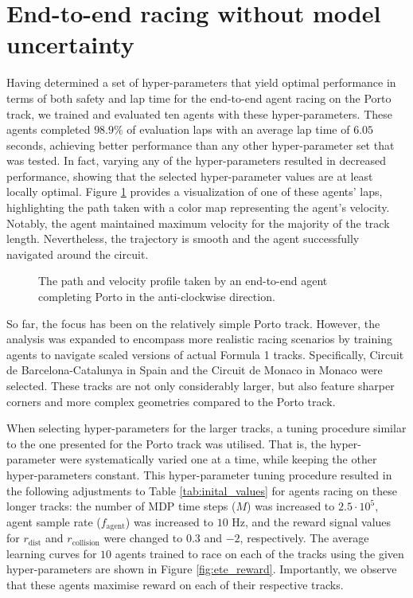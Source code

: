 
\section{End-to-end racing without model uncertainty}

Having determined a set of hyper-parameters that yield optimal performance in terms of both safety and lap time for the end-to-end agent racing on the Porto track, 
we trained and evaluated ten agents with these hyper-parameters.
These agents completed $98.9\%$ of evaluation laps with an average lap time of $6.05$ seconds, achieving better performance than any other hyper-parameter set that was tested.
In fact, varying any of the hyper-parameters resulted in decreased performance, showing that the selected hyper-parameter values are at least locally optimal.
Figure \ref{fig:ete_porto} provides a visualization of one of these agents' laps, highlighting the path taken with a color map representing the agent's velocity. 
Notably, the agent maintained maximum velocity for the majority of the track length.
Nevertheless, the trajectory is smooth and the agent successfully navigated around the circuit.

\begin{figure}[htb!]
    \centering
    
    \caption[The path and velocity profile taken by an end-to-end agent completing Porto]{The path and velocity profile taken by an end-to-end agent completing Porto in the anti-clockwise direction.}
    \label{fig:ete_porto}
\end{figure}


So far, the focus has been on the relatively simple Porto track. 
However, the analysis was expanded to encompass more realistic racing scenarios by training agents to navigate scaled versions of actual Formula 1 tracks. 
Specifically, Circuit de Barcelona-Catalunya in Spain and the Circuit de Monaco in Monaco were selected. 
These tracks are not only considerably larger, but also feature sharper corners and more complex geometries compared to the Porto track.


When selecting hyper-parameters for the larger tracks, a tuning procedure similar to the one presented for the Porto track was utilised. 
That is, the hyper-parameter were systematically varied one at a time, while keeping the other hyper-parameters constant. 
This hyper-parameter tuning procedure resulted in the following adjustments to Table \ref{tab:inital_values} for agents racing on these longer tracks: the number of MDP time steps ($M$) was increased to $2.5\cdot10^{5}$, agent sample rate ($f_{\text{agent}}$) was increased to $10$ Hz, and the reward signal values for $r_{\text{dist}}$ and  $r_{\text{collision}}$ were changed to $0.3$ and $-2$, respectively.
The average learning curves for $10$ agents trained to race on each of the tracks using the given hyper-parameters are shown in Figure \ref{fig:ete_reward}.
Importantly, we observe that these agents maximise reward on each of their respective tracks.

